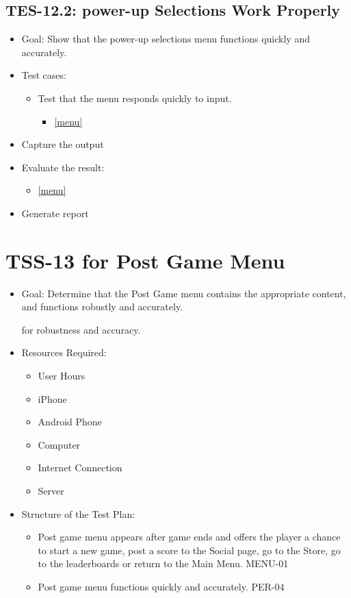 \subsection{TES-12.2: power-up Selections Work Properly }
\begin{itemize}
\item Goal: Show that the power-up selections menu functions quickly and accurately. 
\item Test cases: 

\begin{itemize}
\item Test that the menu responds quickly to input.
\begin{itemize}
\item \ref{menu}
\end{itemize}
\end{itemize}
\item Capture the output 
\item Evaluate the result: 

\begin{itemize}
\item \ref{menu}
\end{itemize}
\item Generate report 
\end{itemize}




\section{TSS-13 for Post Game Menu}
\begin{itemize}
\item Goal: Determine that the Post Game menu contains the appropriate content, and functions robustly and accurately.

for robustness and accuracy.

\item Resources Required:
\begin{itemize}
\item User Hours 
\item iPhone 
\item Android Phone 
\item Computer 
\item Internet Connection 
\item Server
\end{itemize}
\item Structure of the Test Plan: 

\begin{itemize}

\item Post game menu appears after game ends and offers the player a chance to start a new game, post a score to the Social page, 
go to the Store, go to the leaderboards or return to the Main Menu. MENU-01

\item Post game menu functions quickly and accurately. PER-04
\end{itemize}
\end{itemize}

